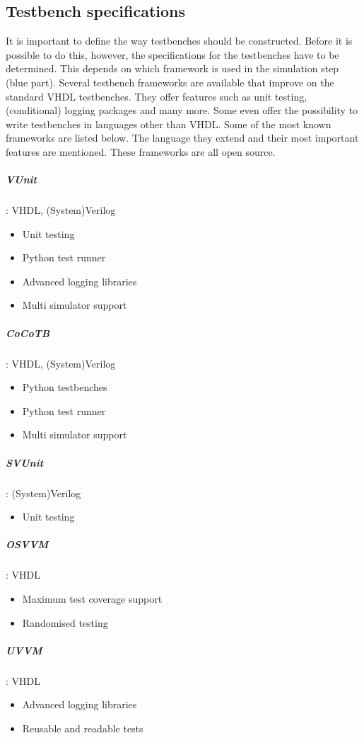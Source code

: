\subsection{Testbench specifications}
It is important to define the way testbenches should be constructed. Before it is possible to do this, however, the specifications for the testbenches have to be determined. This depends on which framework is used in the simulation step (blue part). Several testbench frameworks are available that improve on the standard VHDL testbenches. They offer features such as unit testing, (conditional) logging packages and many more. Some even offer the possibility to write testbenches in languages other than VHDL.
\npar
Some of the most known frameworks are listed below. The language they extend and their most important features are mentioned. These frameworks are all open source.
\subparagraph{VUnit}: VHDL, (System)Verilog
\begin{itemize}
	\setlength\itemsep{.1em}
	\item Unit testing
	\item Python test runner
	\item Advanced logging libraries
	\item Multi simulator support
\end{itemize}
\subparagraph{CoCoTB}: VHDL, (System)Verilog
\begin{itemize}
	\setlength\itemsep{.1em}
	\item Python testbenches
	\item Python test runner
	\item Multi simulator support	
\end{itemize}
\subparagraph{SVUnit}\cite{svunit}: (System)Verilog
\begin{itemize}
	\setlength\itemsep{.1em}
	\item Unit testing
\end{itemize}
\subparagraph{OSVVM}\cite{osvvm}: VHDL
\begin{itemize}
	\setlength\itemsep{.1em}
	\item Maximum test coverage support
	\item Randomised testing
\end{itemize}
\subparagraph{UVVM}\cite{uvvm}: VHDL
\begin{itemize}
	\setlength\itemsep{.1em}
	\item Advanced logging libraries
	\item Reusable and readable tests
\end{itemize}\noindent
